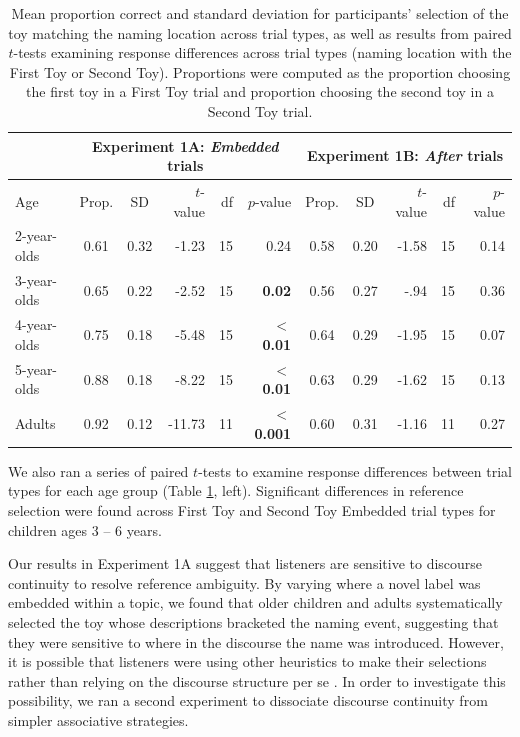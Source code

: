 \documentclass[man]{apa2}
\begin{document}
  \begin{table} [t]
  \caption{Mean proportion correct and standard deviation for participants' selection of the toy matching the naming location across trial types, as well as results from paired $t$-tests examining response differences across trial types (naming location with the First Toy or Second Toy). Proportions were computed as the proportion choosing the first toy in a First Toy trial and proportion choosing the second toy in a Second Toy trial.\label{tab:2} } 
  \begin{center} 
    \begin{tabular}{lccrrr|ccrrr} 
         & \multicolumn{5}{c}{Experiment 1A: {\it Embedded} trials} &  \multicolumn{5}{c}{Experiment 1B: {\it After} trials}\\
                     \hline 
      \null Age & Prop. & SD & $t$-value & df & $p$-value  & Prop. & SD & $t$-value & df & $p$-value  \\ 
      \hline  
       2-year-olds  & 0.61 & 0.32 & -1.23 & 15 & 0.24                          & 0.58 & 0.20 & -1.58 & 15& 0.14\\ 
       3-year-olds  & 0.65 & 0.22 & -2.52 & 15 & \textbf{0.02}            & 0.56 & 0.27 & -.94 & 15 & 0.36 \\ 
       4-year-olds  & 0.75 & 0.18 & -5.48 & 15 & \textbf{$<$0.01}     & 0.64 & 0.29 &-1.95 & 15 & 0.07\\
       5-year-olds  & 0.88 & 0.18 & -8.22 & 15 & \textbf{$<$0.01}      & 0.63 & 0.29  & -1.62 & 15 & 0.13\\ 
       Adults & 0.92 & 0.12 & -11.73 & 11 & \textbf{$<$0.001} & 0.60 & 0.31 & -1.16 & 11 & 0.27 \\
      \hline 
    \end{tabular} 
 \end{center}
\end{table}

We also ran a series of paired $t$-tests to examine response differences between trial types for each age group (Table \ref{tab:2}, left).  Significant differences in reference selection were found across First Toy and Second Toy Embedded trial types for children ages 3 -- 6 years.

Our results in Experiment 1A suggest that listeners are sensitive to discourse continuity to resolve reference ambiguity.  By varying where a novel label was embedded within a topic, we found that older children and adults systematically selected the toy whose descriptions bracketed the naming event, suggesting that they were sensitive to where in the discourse the name was introduced.  However, it is possible that listeners were using other heuristics to make their selections rather than relying on the discourse structure per se \cite{samuelson1998}.  In order to investigate this possibility, we ran a second experiment to dissociate discourse continuity from simpler associative strategies. 
\end{document}
